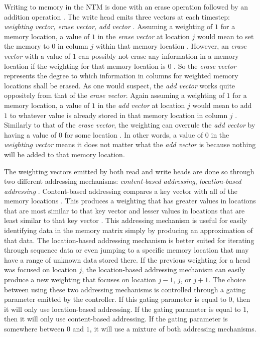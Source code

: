 Writing to memory in the NTM is done with an erase operation followed by an
addition operation \cite{DBLP:journals/corr/GravesWD14}. The write head
emits three vectors at each timestep: \textit{weighting vector, erase vector,
add vector} \cite{DBLP:journals/corr/GravesWD14}. Assuming a weighting of $1$
for a memory location, a value of $1$ in the \textit{erase vector} at location
$j$ would mean to set the memory to $0$ in column $j$ within that memory
location \cite{DBLP:journals/corr/GravesWD14}. However, an
\textit{erase vector} with a value of $1$ can possibly not erase any
information in a memory location if the weighting for that memory location is
$0$ \cite{DBLP:journals/corr/GravesWD14}. So the \textit{erase vector}
represents the degree to which information in columns for weighted memory
locations shall be erased. As one would suspect, the \textit{add vector} works
quite oppositely from that of the \textit{erase vector}. Again assuming a
weighting of $1$ for a memory location, a value of $1$ in the
\textit{add vector} at location $j$ would mean to add $1$ to whatever value
is already stored in that memory location in column $j$
\cite{DBLP:journals/corr/GravesWD14}. Similarly to that of the
\textit{erase vector}, the weighting can overrule the \textit{add vector} by
having a value of $0$ for some location \cite{DBLP:journals/corr/GravesWD14}.
In other words, a value of $0$ in the \textit{weighting vector} means it does
not matter what the \textit{add vector} is because nothing will be added to
that memory location.

The weighting vectors emitted by both read and write heads are done so
through two different addressing mechanisms: \textit{content-based addressing},
\textit{location-based addressing} \cite{DBLP:journals/corr/GravesWD14}.
Content-based addressing compares a key vector with all of the memory locations
\cite{DBLP:journals/corr/GravesWD14}. This produces a weighting that has
greater values in locations that are most similar to that key vector and
lesser values in locations that are least similar to that key vector
\cite{DBLP:journals/corr/GravesWD14}. This addressing mechanism is useful for
easily identifying data in the memory matrix simply by producing an
approximation of that data. The location-based addressing mechanism is better
suited for iterating through sequence data or even jumping to a specific
memory location that may have a range of unknown data stored there. If the
previous weighting for a head was focused on location $j$, the location-based
addressing mechanism can easily produce a new weighting that focuses on
location $j-1$, $j$, or $j+1$. The choice between using these two addressing
mechanisms is controlled through a gating parameter emitted by the controller.
If this gating parameter is equal to $0$, then it will only use location-based
addressing. If the gating parameter is equal to $1$, then it will only use
content-based addressing. If the gating parameter is somewhere between
$0$ and $1$, it will use a mixture of both addressing mechanisms.

